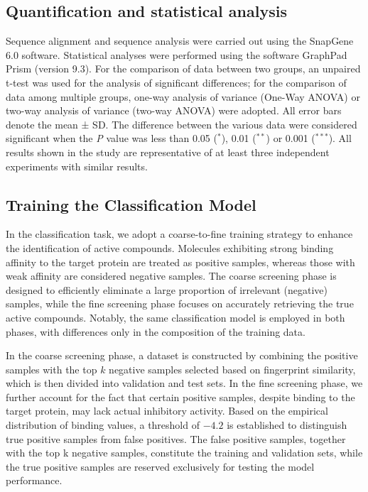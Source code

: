 \documentclass[unnumsec,webpdf,contemporary,large]{oup-authoring-template}%
\theoremstyle{thmstyleone}%
\theoremstyle{thmstyletwo}%
\theoremstyle{thmstylethree}%
\begin{document}
\subsection*{Quantification and statistical analysis}
Sequence alignment and sequence analysis were carried out using the SnapGene 6.0 software. Statistical analyses were performed using the software GraphPad Prism (version 9.3). For the comparison of data between two groups, an unpaired t-test was used for the analysis of significant differences; for the comparison of data among multiple groups, one-way analysis of variance (One-Way ANOVA) or two-way analysis of variance (two-way ANOVA) were adopted. All error bars denote the mean ± SD. The difference between the various data were considered significant when the \textit{P} value was less than 0.05 ($^{\ast}$), 0.01 ($^{\ast\ast}$) or 0.001 ($^{\ast\ast\ast}$). All results shown in the study are representative of at least three independent experiments with similar results.


\subsection*{Training the Classification Model} 

In the classification task, we adopt a coarse-to-fine training strategy to enhance the identification of active compounds. Molecules exhibiting strong binding affinity to the target protein are treated as positive samples, whereas those with weak affinity are considered negative samples. The coarse screening phase is designed to efficiently eliminate a large proportion of irrelevant (negative) samples, while the fine screening phase focuses on accurately retrieving the true active compounds. Notably, the same classification model is employed in both phases, with differences only in the composition of the training data.

In the coarse screening phase, a dataset is constructed by combining the positive samples with the top $k$ negative samples selected based on fingerprint similarity, which is then divided into validation and test sets. In the fine screening phase, we further account for the fact that certain positive samples, despite binding to the target protein, may lack actual inhibitory activity. Based on the empirical distribution of binding values, a threshold of $-4.2$ is established to distinguish true positive samples from false positives. The false positive samples, together with the top k negative samples, constitute the training and validation sets, while the true positive samples are reserved exclusively for testing the model performance.
\end{document}
